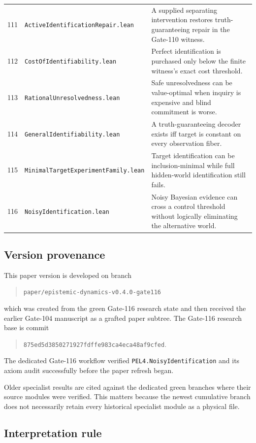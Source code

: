 \begin{center}
\begin{tabularx}{\textwidth}{@{}p{}p{}X@{}}
111 & \texttt{ActiveIdentificationRepair.lean} & A supplied separating intervention restores truth-guaranteeing repair in the Gate-110 witness. \\
112 & \texttt{CostOfIdentifiability.lean} & Perfect identification is purchased only below the finite witness's exact cost threshold. \\
113 & \texttt{RationalUnresolvedness.lean} & Safe unresolvedness can be value-optimal when inquiry is expensive and blind commitment is worse. \\
114 & \texttt{GeneralIdentifiability.lean} & A truth-guaranteeing decoder exists iff target is constant on every observation fiber. \\
115 & \texttt{MinimalTargetExperimentFamily.lean} & Target identification can be inclusion-minimal while full hidden-world identification still fails. \\
116 & \texttt{NoisyIdentification.lean} & Noisy Bayesian evidence can cross a control threshold without logically eliminating the alternative world. \\
\bottomrule
\end{tabularx}
\end{center}

\subsection{Version provenance}

This paper version is developed on branch
\begin{quote}
\texttt{paper/epistemic-dynamics-v0.4.0-gate116}
\end{quote}
which was created from the green Gate-116 research state and then received the earlier Gate-104 manuscript as a grafted paper subtree. The Gate-116 research base is commit
\begin{quote}
\texttt{875ed5d3850271927fdffe983ca4eca48af9cfed}.
\end{quote}
The dedicated Gate-116 workflow verified \texttt{PEL4.NoisyIdentification} and its axiom audit successfully before the paper refresh began.

Older specialist results are cited against the dedicated green branches where their source modules were verified. This matters because the newest cumulative branch does not necessarily retain every historical specialist module as a physical file.

\subsection{Interpretation rule}

